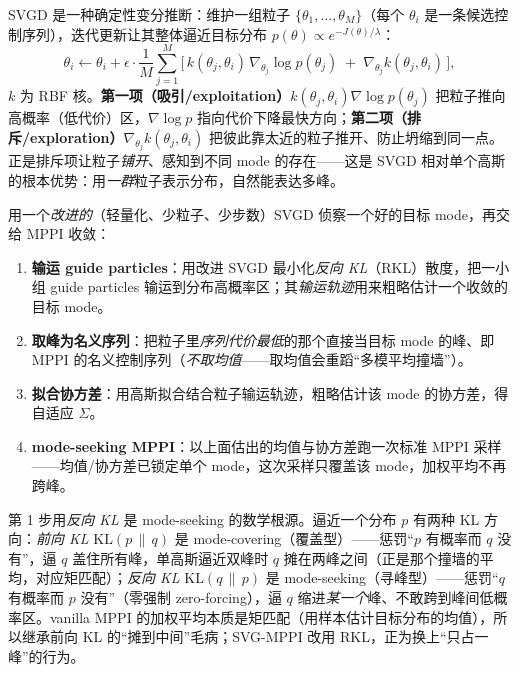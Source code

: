 \begin{definition}\label{def:mv-svgd}
SVGD 是一种确定性变分推断：维护一组粒子 $\{\theta_1,\dots,\theta_M\}$（每个 $\theta_i$ 是一条候选控制序列），迭代更新让其整体逼近目标分布 $p(\theta)\propto e^{-J(\theta)/\lambda}$：
\begin{equation}
  \theta_i \leftarrow \theta_i+\epsilon\cdot\frac{1}{M}\sum_{j=1}^{M}\Big[\,k(\theta_j,\theta_i)\,\nabla_{\theta_j}\log p(\theta_j)\;+\;\nabla_{\theta_j}k(\theta_j,\theta_i)\,\Big],
  \label{eq:mv-svgd}
\end{equation}
$k$ 为 RBF 核。\textbf{第一项（吸引/exploitation）}$k(\theta_j,\theta_i)\nabla\log p(\theta_j)$ 把粒子推向高概率（低代价）区，$\nabla\log p$ 指向代价下降最快方向；\textbf{第二项（排斥/exploration）}$\nabla_{\theta_j}k(\theta_j,\theta_i)$ 把彼此靠太近的粒子推开、防止坍缩到同一点。正是排斥项让粒子\emph{铺开}、感知到不同 mode 的存在——这是 SVGD 相对单个高斯的根本优势：用\emph{一群}粒子表示分布，自然能表达多峰。
\end{definition}

\begin{algo}\label{alg:mv-svg}
用一个\emph{改进的}（轻量化、少粒子、少步数）SVGD 侦察一个好的目标 mode，再交给 MPPI 收敛\cite{honda2024svgmppi}：
\begin{enumerate}
  \item \textbf{输运 guide particles}：用改进 SVGD 最小化\emph{反向 KL}（RKL）散度，把一小组 guide particles 输运到分布高概率区；其\emph{输运轨迹}用来粗略估计一个收敛的目标 mode。
  \item \textbf{取峰为名义序列}：把粒子里\emph{序列代价最低}的那个直接当目标 mode 的峰、即 MPPI 的名义控制序列（\emph{不取均值}——取均值会重蹈“多模平均撞墙”）。
  \item \textbf{拟合协方差}：用高斯拟合结合粒子输运轨迹，粗略估计该 mode 的协方差，得自适应 $\Sigma$。
  \item \textbf{mode-seeking MPPI}：以上面估出的均值与协方差跑一次标准 MPPI 采样——均值/协方差已锁定单个 mode，这次采样只覆盖该 mode，加权平均不再跨峰。
\end{enumerate}
\end{algo}

\noindent 第 1 步用\emph{反向 KL} 是 mode-seeking 的数学根源。逼近一个分布 $p$ 有两种 KL 方向：\emph{前向 KL} $\mathrm{KL}(p\,\|\,q)$ 是 mode-covering（覆盖型）——惩罚“$p$ 有概率而 $q$ 没有”，逼 $q$ 盖住所有峰，单高斯逼近双峰时 $q$ 摊在两峰之间（正是那个撞墙的平均，对应矩匹配）；\emph{反向 KL} $\mathrm{KL}(q\,\|\,p)$ 是 mode-seeking（寻峰型）——惩罚“$q$ 有概率而 $p$ 没有”（零强制 zero-forcing），逼 $q$ 缩进\emph{某一个}峰、不敢跨到峰间低概率区。vanilla MPPI 的加权平均本质是矩匹配（用样本估计目标分布的均值），所以继承前向 KL 的“摊到中间”毛病；SVG-MPPI 改用 RKL，正为换上“只占一峰”的行为。

